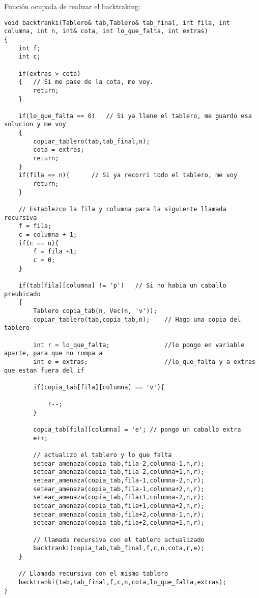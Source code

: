 \documentclass[a4paper]{article}
\begin{document}
Función ocupada de realizar el backtraking:
\begin{lstlisting}
void backtranki(Tablero& tab,Tablero& tab_final, int fila, int columna, int n, int& cota, int lo_que_falta, int extras)
{
	int f;
	int c;
	
	if(extras > cota)
	{	// Si me pase de la cota, me voy.
		return;
	}

	if(lo_que_falta == 0)	// Si ya llene el tablero, me guardo esa solucion y me voy
	{
		copiar_tablero(tab,tab_final,n);
		cota = extras;
		return;
	}
	if(fila == n){		// Si ya recorri todo el tablero, me voy
		return;
	}
	
	// Establezco la fila y columna para la siguiente llamada recursiva
	f = fila;
	c = columna + 1;
	if(c == n){
		f = fila +1;
		c = 0;
	}
	
	if(tab[fila][columna] != 'p')	// Si no habia un caballo preubicado
	{
		Tablero copia_tab(n, Vec(n, 'v'));
		copiar_tablero(tab,copia_tab,n);	// Hago una copia del tablero

		int r = lo_que_falta;				//lo pongo en variable aparte, para que no rompa a
		int e = extras;						//lo_que_falta y a extras que estan fuera del if
		
		if(copia_tab[fila][columna] == 'v'){

			r--;
		}

		copia_tab[fila][columna] = 'e';	// pongo un caballo extra
		e++;
		
		// actualizo el tablero y lo que falta
		setear_amenaza(copia_tab,fila-2,columna-1,n,r);	
		setear_amenaza(copia_tab,fila-2,columna+1,n,r);
		setear_amenaza(copia_tab,fila-1,columna-2,n,r);	
		setear_amenaza(copia_tab,fila-1,columna+2,n,r);
		setear_amenaza(copia_tab,fila+1,columna-2,n,r);
		setear_amenaza(copia_tab,fila+1,columna+2,n,r);
		setear_amenaza(copia_tab,fila+2,columna-1,n,r);
		setear_amenaza(copia_tab,fila+2,columna+1,n,r);
		
		// llamada recursiva con el tablero actualizado
		backtranki(copia_tab,tab_final,f,c,n,cota,r,e);
	}

	// Llamada recursiva con el mismo tablero
	backtranki(tab,tab_final,f,c,n,cota,lo_que_falta,extras);
}
\end{lstlisting}
\end{document}
